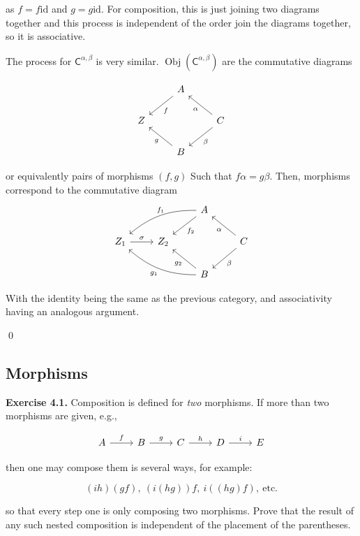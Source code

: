 \documentclass[titlepage]{article}
\newcommand{\Exercise}[1]{\textbf{Exercise #1}}
\newcommand{\cat}[1]{\mathsf{#1}}
\newcommand{\Cat}{\cat{C}}
\newcommand{\id}{\text{id}}
\DeclareMathOperator{\Obj}{Obj}
\begin{document}
as $f = f \id$ and $g = g \id$. For composition, this is just joining two diagrams together and this process is independent of the order join the diagrams together, so it is associative.

The process for $\Cat^{\alpha,\beta}$ is very similar. $\Obj(\Cat^{\alpha,\beta})$ are the commutative diagrams

\[
\begin{tikzcd}
    & A \arrow[ld, "f"] & \\ Z & & C \arrow[lu, "\alpha"] \arrow[ld,"\beta"] \\ & B \arrow[lu, "g"] &
\end{tikzcd}\]


or equivalently pairs of morphisms $(f,g)$ Such that $f\alpha=g\beta$. Then, morphisms correspond to the commutative diagram
\[
\begin{tikzcd}
    & & A \arrow[lld, "f_1" above, bend right=20] \arrow[ld,"f_2"] & \\ Z_1 \arrow[r, "\sigma"] & Z_2 & & C \arrow[lu,"\alpha"] \arrow[ld,"\beta"] \\ & & B \arrow[llu,"g_1", bend left=20] \arrow[lu, "g_2"] &
\end{tikzcd}\]

With the identity being the same as the previous category, and associativity having an analogous argument.

\qed

\bigskip

\subsection{Morphisms}

\bigskip

\Exercise{4.1.} Composition is defined for  \textit{two} morphisms. If more than two morphisms are given, e.g.,

\[
\begin{tikzcd}
    A \arrow[r,"f"] & B \arrow[r,"g"] & C \arrow[r,"h"] & D \arrow[r,"i"] & E
\end{tikzcd}\]

then one may compose them is several ways, for example:

\[ (ih)(gf), \ (i(hg))f, \ i((hg)f), \ \text{etc.} \]

so that every step one is only composing two morphisms. Prove that the result of any such nested composition is independent of the placement of the parentheses.

\medskip
\end{document}
